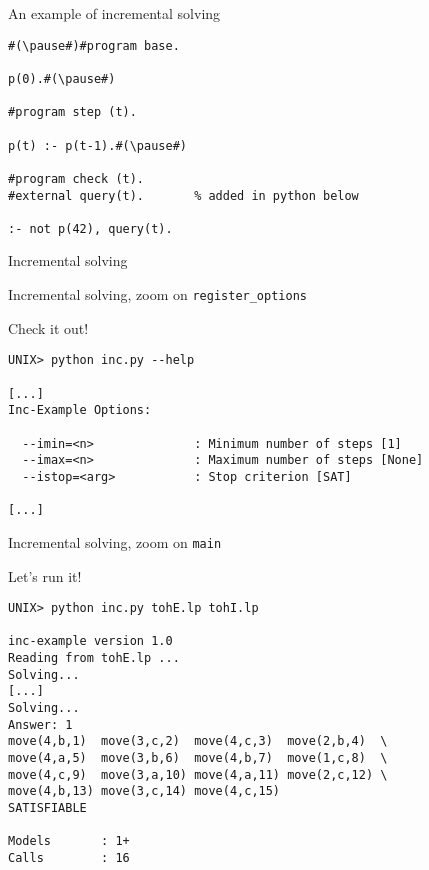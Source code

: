 \begin{frame}[fragile,c]{An example of incremental solving}
\begin{lstlisting}
#(\pause#)#program base.

p(0).#(\pause#)

#program step (t).

p(t) :- p(t-1).#(\pause#)

#program check (t).
#external query(t).       % added in python below

:- not p(42), query(t).
\end{lstlisting}
\end{frame}
\begin{frame}{Incremental solving}
  
\end{frame}
\begin{frame}{Incremental solving, zoom on \texttt{register\_options}}
  \bigskip
  
\end{frame}
\begin{frame}[fragile]{Check it out!}
\scriptsize\medskip
\begin{lstlisting}
UNIX> python inc.py --help

[...]
Inc-Example Options:

  --imin=<n>              : Minimum number of steps [1]
  --imax=<n>              : Maximum number of steps [None]
  --istop=<arg>           : Stop criterion [SAT]

[...]
\end{lstlisting}
\end{frame}
\begin{frame}{Incremental solving, zoom on \texttt{main}}
  \bigskip
  
\end{frame}
\begin{frame}[fragile]{Let's run it!}
\scriptsize\medskip
\begin{lstlisting}
UNIX> python inc.py tohE.lp tohI.lp

inc-example version 1.0
Reading from tohE.lp ...
Solving...
[...]
Solving...
Answer: 1
move(4,b,1)  move(3,c,2)  move(4,c,3)  move(2,b,4)  \
move(4,a,5)  move(3,b,6)  move(4,b,7)  move(1,c,8)  \
move(4,c,9)  move(3,a,10) move(4,a,11) move(2,c,12) \
move(4,b,13) move(3,c,14) move(4,c,15)
SATISFIABLE

Models       : 1+
Calls        : 16
\end{lstlisting}
\end{frame}
%
